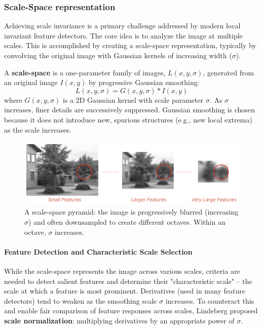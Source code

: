\subsubsection{Scale-Space representation}
Achieving scale invariance is a primary challenge addressed by modern local invariant feature detectors. The core idea is to analyze the image at multiple scales. This is accomplished by creating a scale-space representation, typically by convolving the original image with Gaussian kernels of increasing width ($\sigma$).

A \textbf{scale-space} is a one-parameter family of images, $L(x,y,\sigma)$, generated from an original image $I(x,y)$ by progressive Gaussian smoothing:
\[ L(x,y,\sigma) = G(x,y,\sigma) * I(x,y) \]
where $G(x,y,\sigma)$ is a 2D Gaussian kernel with scale parameter $\sigma$. As $\sigma$ increases, finer details are successively suppressed. Gaussian smoothing is chosen because it does not introduce new, spurious structures (e.g., new local extrema) as the scale increases.

\begin{figure}[htbp]
  \centering
  \includegraphics[width=0.9\linewidth]{./img/scale_space.jpg}
  \caption{A scale-space pyramid: the image is progressively blurred (increasing $\sigma$) and often downsampled to create different octaves. Within an octave, $\sigma$ increases.}
  \label{fig:scale_space}
\end{figure}

\paragraph{Feature Detection and Characteristic Scale Selection}
While the scale-space represents the image across various scales, criteria are needed to detect salient features and determine their "characteristic scale" – the scale at which a feature is most prominent.
Derivatives (used in many feature detectors) tend to weaken as the smoothing scale $\sigma$ increases. To counteract this and enable fair comparison of feature responses across scales, Lindeberg proposed \textbf{scale normalization}: multiplying derivatives by an appropriate power of $\sigma$.

